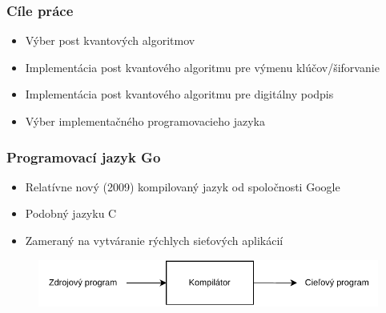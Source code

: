 \documentclass[%
  14pt,       				%
	t,                  %
	aspectratio=1610,   %
	unicode,						%
]{beamer}				    	%
\begin{document}
\disablenavigationsymbols

\maketitle


\begin{frame}[c]
	\frametitle{Cíle práce}
	\large{\begin{itemize}
			\item Výber post kvantových algoritmov
			\item Implementácia post kvantového algoritmu pre výmenu klúčov/šiforvanie
			\item Implementácia post kvantového algoritmu pre digitálny podpis
			\item Výber implementačného programovacieho jazyka
		\end{itemize}}
	
\end{frame}



\begin{frame}[c]
	\frametitle{Programovací jazyk Go}
	\large{\begin{itemize}
			\item Relatívne nový (2009) kompilovaný jazyk od spoločnosti Google
			\item Podobný jazyku C
			\item Zameraný na vytváranie rýchlych sieťových aplikácií
		\end{itemize}}
	
	\begin{figure}[htbp]
		\centering
		\includegraphics[width=\textwidth]{pictures/compiler_sk.pdf}
	\end{figure}
\end{frame}
\end{document}
